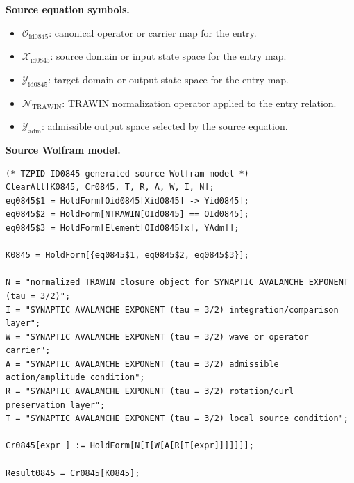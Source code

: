 \begin{minipage}[t]{0.49\linewidth}
\begingroup
\small
\raggedright
\textbf{Source equation symbols.}\par
\begin{itemize}[leftmargin=1.35em,itemsep=1pt,topsep=1pt,parsep=0pt]
    \item $\mathcal{O}_{\mathrm{id0845}}$: canonical operator or carrier map for the entry.
    \item $\mathcal{X}_{\mathrm{id0845}}$: source domain or input state space for the entry map.
    \item $\mathcal{Y}_{\mathrm{id0845}}$: target domain or output state space for the entry map.
    \item $\mathcal{N}_{\mathrm{TRAWIN}}$: TRAWIN normalization operator applied to the entry relation.
    \item $\mathcal{Y}_{\mathrm{adm}}$: admissible output space selected by the source equation.
\end{itemize}
\endgroup
\end{minipage}\hfill
\begin{minipage}[t]{0.47\linewidth}
\begingroup
\scriptsize
\raggedright
\textbf{Source Wolfram model.}\par
\begin{Verbatim}[fontsize=\tiny,breaklines=true,breakanywhere=true]
(* TZPID ID0845 generated source Wolfram model *)
ClearAll[K0845, Cr0845, T, R, A, W, I, N];
eq0845$1 = HoldForm[Oid0845[Xid0845] -> Yid0845];
eq0845$2 = HoldForm[NTRAWIN[OId0845] == OId0845];
eq0845$3 = HoldForm[Element[OId0845[x], YAdm]];

K0845 = HoldForm[{eq0845$1, eq0845$2, eq0845$3}];

N = "normalized TRAWIN closure object for SYNAPTIC AVALANCHE EXPONENT (tau = 3/2)";
I = "SYNAPTIC AVALANCHE EXPONENT (tau = 3/2) integration/comparison layer";
W = "SYNAPTIC AVALANCHE EXPONENT (tau = 3/2) wave or operator carrier";
A = "SYNAPTIC AVALANCHE EXPONENT (tau = 3/2) admissible action/amplitude condition";
R = "SYNAPTIC AVALANCHE EXPONENT (tau = 3/2) rotation/curl preservation layer";
T = "SYNAPTIC AVALANCHE EXPONENT (tau = 3/2) local source condition";

Cr0845[expr_] := HoldForm[N[I[W[A[R[T[expr]]]]]]];

Result0845 = Cr0845[K0845];
\end{Verbatim}
\endgroup
\end{minipage}

